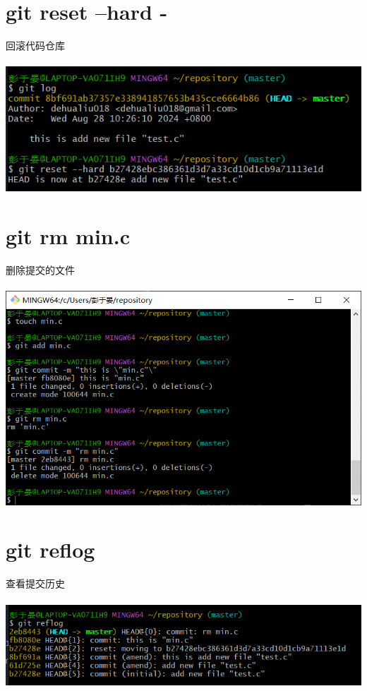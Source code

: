 \documentclass[a4paper, 12pt]{article}
\begin{document}
\section{git reset --hard -}
回滚代码仓库\\ \\
\includegraphics[width=1\linewidth]{7.png}
  
\section{git rm min.c}
删除提交的文件 \\ \\
\includegraphics[width=1\linewidth]{8.png}
  
\section{git reflog}
查看提交历史\\ \\
\includegraphics[width=1\linewidth]{9.png}
\end{document}
